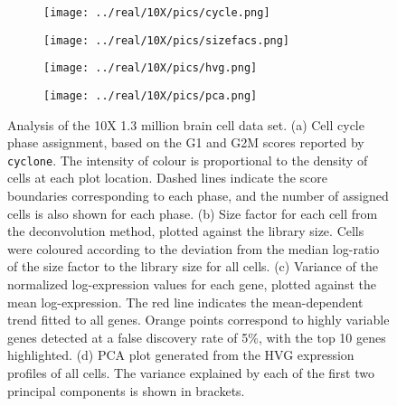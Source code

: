 \documentclass[10pt,letterpaper]{article}
\newcommand{\code}[1]{\texttt{#1}}
\begin{document}
\begin{figure}
    \begin{subfigure}[b]{0.49\textwidth}
        \texttt{[image: ../real/10X/pics/cycle.png]}
        \caption{}
    \end{subfigure}
    \begin{subfigure}[b]{0.49\textwidth}
        \texttt{[image: ../real/10X/pics/sizefacs.png]}
        \caption{}
    \end{subfigure}
    \begin{subfigure}[b]{0.49\textwidth}
        \texttt{[image: ../real/10X/pics/hvg.png]}
        \caption{}
    \end{subfigure}
    \begin{subfigure}[b]{0.49\textwidth}
        \texttt{[image: ../real/10X/pics/pca.png]}
        \caption{}
    \end{subfigure}
    \caption{Analysis of the 10X 1.3 million brain cell data set.
        (a) Cell cycle phase assignment, based on the G1 and G2M scores reported by \code{cyclone}.
        The intensity of colour is proportional to the density of cells at each plot location.
        Dashed lines indicate the score boundaries corresponding to each phase, and the number of assigned cells is also shown for each phase.
        (b) Size factor for each cell from the deconvolution method, plotted against the library size.
        Cells were coloured according to the deviation from the median log-ratio of the size factor to the library size for all cells.
        (c) Variance of the normalized log-expression values for each gene, plotted against the mean log-expression.
        The red line indicates the mean-dependent trend fitted to all genes.
        Orange points correspond to highly variable genes detected at a false discovery rate of 5\%, with the top 10 genes highlighted.
        (d) PCA plot generated from the HVG expression profiles of all cells.
        The variance explained by each of the first two principal components is shown in brackets.
    }
    \label{fig:tenx}
\end{figure}
\end{document}
